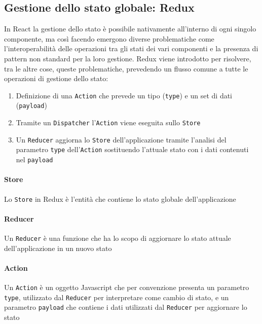\subsection{Gestione dello stato globale: Redux}
In React la gestione dello stato è possibile nativamente all'interno di ogni singolo componente, ma così facendo emergono diverse problematiche come l'interoperabilità delle operazioni tra gli stati dei vari componenti e la presenza di pattern non standard per la loro gestione. Redux viene introdotto per risolvere, tra le altre cose, queste problematiche, prevedendo un flusso comune a tutte le operazioni di gestione dello stato:
\begin{enumerate}
  \item Definizione di una \lstinline[basicstyle=\ttfamily]!Action! che prevede un tipo (\lstinline[basicstyle=\ttfamily]!type!) e un set di dati (\lstinline[basicstyle=\ttfamily]!payload!)
  \item Tramite un \lstinline[basicstyle=\ttfamily]!Dispatcher! l'\lstinline[basicstyle=\ttfamily]!Action! viene eseguita sullo \lstinline[basicstyle=\ttfamily]!Store!
  \item Un \lstinline[basicstyle=\ttfamily]!Reducer! aggiorna lo \lstinline[basicstyle=\ttfamily]!Store! dell'applicazione tramite l'analisi del parametro \lstinline[basicstyle=\ttfamily]!type! dell'\lstinline[basicstyle=\ttfamily]!Action! sostituendo l'attuale stato con i dati contenuti nel \lstinline[basicstyle=\ttfamily]!payload!
\end{enumerate}
\paragraph{Store} Lo \lstinline[basicstyle=\ttfamily]!Store! in Redux è l'entità che contiene lo stato globale dell'applicazione
\paragraph{Reducer} Un \lstinline[basicstyle=\ttfamily]!Reducer! è una funzione che ha lo scopo di aggiornare lo stato attuale dell'applicazione in un nuovo stato
\paragraph{Action} Un \lstinline[basicstyle=\ttfamily]!Action! è un oggetto Javascript che per convenzione presenta un parametro \lstinline[basicstyle=\ttfamily]!type!, utilizzato dal \lstinline[basicstyle=\ttfamily]!Reducer! per interpretare come cambio di stato, e un parametro \lstinline[basicstyle=\ttfamily]!payload! che contiene i dati utilizzati dal \lstinline[basicstyle=\ttfamily]!Reducer! per aggiornare lo stato
